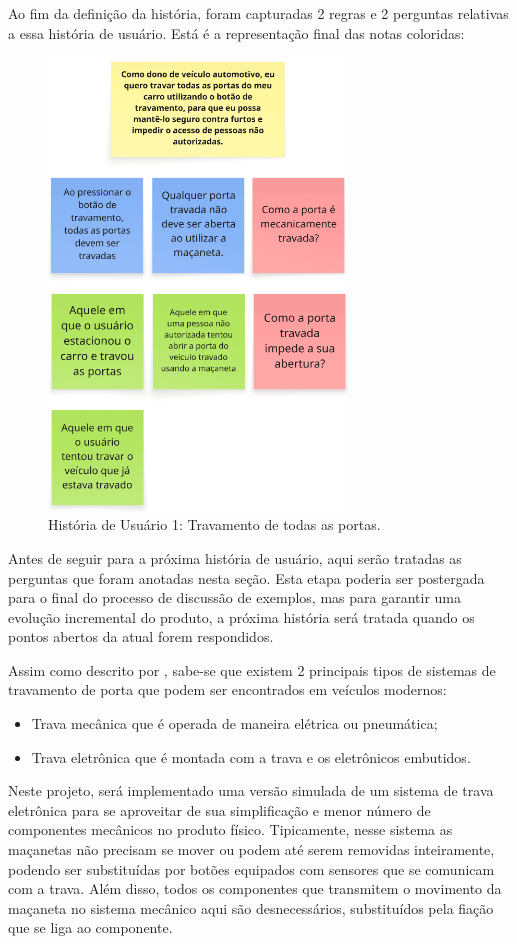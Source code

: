 Ao fim da definição da história, foram capturadas 2 regras e 2 perguntas relativas a essa história de usuário. Está é a representação final das notas coloridas:

\begin{figure}[H]
\centering
\includegraphics[height=12cm]{figuras/user_story_1.png}
\caption{História de Usuário 1: Travamento de todas as portas.}
\label{fig:historia1}
\end{figure}

Antes de seguir para a próxima história de usuário, aqui serão tratadas as perguntas que foram anotadas nesta seção. Esta etapa poderia ser postergada 
para o final do processo de discussão de exemplos, mas para garantir uma evolução incremental do produto, a próxima história será tratada quando os pontos 
abertos da atual forem respondidos.

Assim como descrito por , sabe-se que existem 2 principais tipos de sistemas de travamento de porta que podem ser encontrados em veículos modernos:
\begin{itemize}
    \item Trava mecânica que é operada de maneira elétrica ou pneumática;
    \item Trava eletrônica que é montada com a trava e os eletrônicos embutidos.
\end{itemize}

Neste projeto, será implementado uma versão simulada de um sistema de trava eletrônica para se aproveitar de sua simplificação e menor número de componentes 
mecânicos no produto físico. Tipicamente, nesse sistema as maçanetas não precisam se mover ou podem até serem removidas inteiramente, podendo ser substituídas 
por botões equipados com sensores que se comunicam com a trava. Além disso, todos os componentes que transmitem o movimento da maçaneta no sistema mecânico aqui 
são desnecessários, substituídos pela fiação que se liga ao componente.

